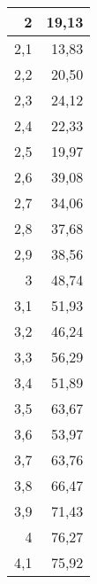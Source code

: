 \documentclass{article}
\begin{document}
\begin{center}
\begin{longtable}{|r|r|}
2                                  & 19,13                              \\ \hline
2,1                                & 13,83                              \\ \hline
2,2                                & 20,50                               \\ \hline
2,3                                & 24,12                              \\ \hline
2,4                                & 22,33                              \\ \hline
2,5                                & 19,97                              \\ \hline
2,6                                & 39,08                              \\ \hline
2,7                                & 34,06                              \\ \hline
2,8                                & 37,68                              \\ \hline
2,9                                & 38,56                              \\ \hline
3                                  & 48,74                              \\ \hline
3,1                                & 51,93                              \\ \hline
3,2                                & 46,24                              \\ \hline
3,3                                & 56,29                              \\ \hline
3,4                                & 51,89                              \\ \hline
3,5                                & 63,67                              \\ \hline
3,6                                & 53,97                              \\ \hline
3,7                                & 63,76                              \\ \hline
3,8                                & 66,47                              \\ \hline
3,9                                & 71,43                              \\ \hline
4                                  & 76,27                              \\ \hline
4,1                                & 75,92                              \\ \hline

\end{longtable}
\end{center}
\end{document}
